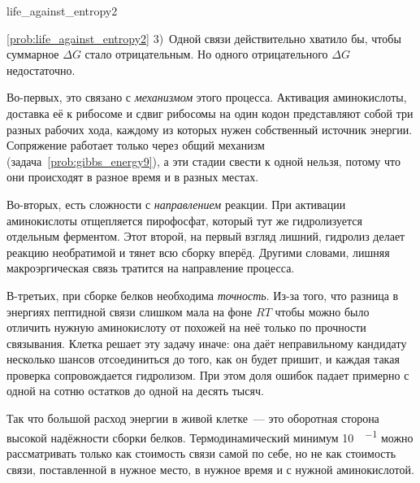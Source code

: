 \begin{problem}{}{life_against_entropy2}
\begin{sol}{\ref{prob:life_against_entropy2}}
        3)~Одной связи действительно хватило бы, чтобы суммарное $\Delta G$ стало отрицательным. Но одного отрицательного $\Delta G$ недостаточно.

        Во-первых, это связано с \emph{механизмом} этого процесса. Активация аминокислоты, доставка её к рибосоме и сдвиг рибосомы на один кодон представляют собой три разных рабочих хода, каждому из которых нужен собственный источник энергии. Сопряжение работает только через общий механизм (задача~\ref{prob:gibbs_energy9}), а эти стадии свести к одной нельзя, потому что они происходят в разное время и в разных местах.

        Во-вторых, есть сложности с \emph{направлением} реакции. При активации аминокислоты отщепляется пирофосфат, который тут же гидролизуется отдельным ферментом. Этот второй, на первый взгляд лишний, гидролиз делает реакцию необратимой и тянет всю сборку вперёд. Другими словами, лишняя макроэргическая связь тратится на направление процесса.

        В-третьих, при сборке белков необходима \emph{точность}. Из-за того, что разница в энергиях пептидной связи слишком мала на фоне $RT$ чтобы можно было отличить нужную аминокислоту от похожей на неё только по прочности связывания. Клетка решает эту задачу иначе: она даёт неправильному кандидату несколько шансов отсоединиться до того, как он будет пришит, и каждая такая проверка сопровождается гидролизом. При этом доля ошибок падает примерно с одной на сотню остатков до одной на десять тысяч.

        Так что большой расход энергии в живой клетке~--- это оборотная сторона высокой надёжности сборки белков. Термодинамический минимум \qty{10}{\ruKJ\per\ruMole} можно рассматривать только как стоимость связи самой по себе, но не как стоимость связи, поставленной в нужное место, в нужное время и с нужной аминокислотой.
    \end{sol}
\end{problem}